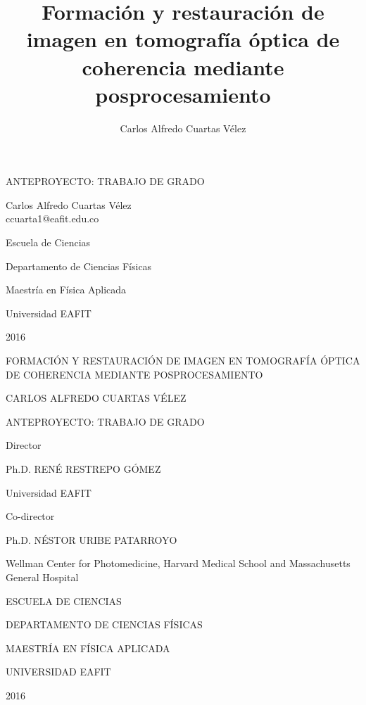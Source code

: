 \author{Carlos Alfredo Cuartas Vélez}
\title{Formación y restauración de imagen en tomografía óptica de coherencia mediante posprocesamiento}

\newcommand\portada{
	\begin{titlepage}
		\begin{center}
			\vfill
			{\large  ANTEPROYECTO: TRABAJO DE GRADO}
			\vfill
			\vfill
			{\large  Carlos Alfredo Cuartas Vélez\\
			ccuarta1@eafit.edu.co \par}
			\vfill
			
			{\normalsize  Escuela de Ciencias \par}
			{\normalsize  Departamento de Ciencias Físicas \par}
			{\normalsize  Maestría en Física Aplicada \par}
			{\normalsize  Universidad EAFIT \par}
			{\normalsize  2016\par}
		\end{center}
	\end{titlepage}
}

\newcommand\contraportada{
	\begin{titlepage}
		\begin{center}
			{\large  FORMACIÓN Y RESTAURACIÓN DE IMAGEN EN TOMOGRAFÍA ÓPTICA DE COHERENCIA MEDIANTE POSPROCESAMIENTO}
			\vfill
			{\large  CARLOS ALFREDO CUARTAS VÉLEZ \par} %
			\vfill
			{\large  ANTEPROYECTO: TRABAJO DE GRADO}
			\vfill
			{\large Director \par} 
            {\large Ph.D. RENÉ RESTREPO GÓMEZ \par}
            {\normalsize Universidad EAFIT \par}
            \vfil
            \vspace{18pt}
            {\large  Co-director \par}
            {\large  Ph.D. NÉSTOR URIBE PATARROYO \par}                        
            {\normalsize Wellman Center for Photomedicine, Harvard Medical School and Massachusetts General Hospital \par}
			\vfill
			
			{\normalsize  ESCUELA DE CIENCIAS \par}
			{\normalsize  DEPARTAMENTO DE CIENCIAS FÍSICAS \par}
			{\normalsize  MAESTRÍA EN FÍSICA APLICADA \par}
			{\normalsize  UNIVERSIDAD EAFIT \par}
			{\normalsize  2016\par}
		\end{center}
\end{titlepage}
}

\portada 
\thispagestyle{empty}

\newpage\null\thispagestyle{empty}\newpage

\contraportada
\thispagestyle{empty}
\newpage\null\thispagestyle{empty}\newpage

\thispagestyle{empty}
\newpage
